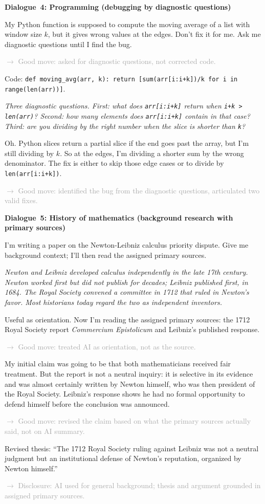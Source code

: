 \documentclass{SIAMbook2023}
\newenvironment{dialogue}[1]%
  {\par\medskip\noindent\textbf{\textcolor{guideblue}{#1}}\par\smallskip
   \begin{list}{}{\setlength{\leftmargin}{1.5em}\setlength{\rightmargin}{0.5em}\setlength{\itemsep}{0.4em}\setlength{\topsep}{0pt}}}
  {\end{list}\par\medskip}
\newcommand{\studentturn}[1]{\item[\textbf{Student.}] #1}
\newcommand{\aiturn}[1]{\item[\textbf{AI.}] \textit{#1}}
\newcommand{\dialogueannotate}[1]{\par\smallskip\hspace{2em}\textcolor{darkgray}{\footnotesize\textsf{$\rightarrow$ #1}}\par}
\begin{document}
\begin{dialogue}{Dialogue~4: Programming (debugging by diagnostic questions)}
\studentturn{My Python function is supposed to compute the moving average of a list with window size $k$, but it gives wrong values at the edges. Don't fix it for me. Ask me diagnostic questions until I find the bug.}
\dialogueannotate{Good move: asked for diagnostic questions, not corrected code.}

\studentturn{Code: \texttt{def moving\_avg(arr, k): return [sum(arr[i:i+k])/k for i in range(len(arr))]}.}

\aiturn{Three diagnostic questions. First: what does \texttt{arr[i:i+k]} return when \texttt{i+k > len(arr)}? Second: how many elements does \texttt{arr[i:i+k]} contain in that case? Third: are you dividing by the right number when the slice is shorter than \texttt{k}?}

\studentturn{Oh. Python slices return a partial slice if the end goes past the array, but I'm still dividing by $k$. So at the edges, I'm dividing a shorter sum by the wrong denominator. The fix is either to skip those edge cases or to divide by \texttt{len(arr[i:i+k])}.}
\dialogueannotate{Good move: identified the bug from the diagnostic questions, articulated two valid fixes.}
\end{dialogue}

\begin{dialogue}{Dialogue~5: History of mathematics (background research with primary sources)}
\studentturn{I'm writing a paper on the Newton-Leibniz calculus priority dispute. Give me background context; I'll then read the assigned primary sources.}

\aiturn{Newton and Leibniz developed calculus independently in the late 17th century. Newton worked first but did not publish for decades; Leibniz published first, in 1684. The Royal Society convened a committee in 1712 that ruled in Newton's favor. Most historians today regard the two as independent inventors.}

\studentturn{Useful as orientation. Now I'm reading the assigned primary sources: the 1712 Royal Society report \emph{Commercium Epistolicum} and Leibniz's published response.}
\dialogueannotate{Good move: treated AI as orientation, not as the source.}

\studentturn{[After reading.] My initial claim was going to be that both mathematicians received fair treatment. But the report is not a neutral inquiry: it is selective in its evidence and was almost certainly written by Newton himself, who was then president of the Royal Society. Leibniz's response shows he had no formal opportunity to defend himself before the conclusion was announced.}
\dialogueannotate{Good move: revised the claim based on what the primary sources actually said, not on AI summary.}

\studentturn{Revised thesis: ``The 1712 Royal Society ruling against Leibniz was not a neutral judgment but an institutional defense of Newton's reputation, organized by Newton himself.''}
\dialogueannotate{Disclosure: AI used for general background; thesis and argument grounded in assigned primary sources.}
\end{dialogue}
\end{document}
